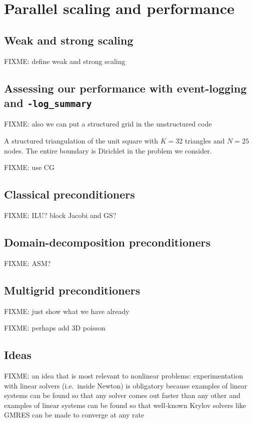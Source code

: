 
\chapter{Parallel scaling and performance}
\label{chap:scaling}

\section{Weak and strong scaling}

FIXME: define weak and strong scaling

\section{Assessing our performance with event-logging and \texttt{-log\_summary}}

\vspace{4cm}

FIXME: also we can put a structured grid in the unstructured code

\begin{marginfigure}

\caption{A structured triangulation of the unit square with $K=32$ triangles and $N=25$ nodes.  The entire boundary is Dirichlet in the problem we consider.}
\label{fig:structuredfem}
\end{marginfigure}

FIXME: use CG

\section{Classical preconditioners}

FIXME:  ILU?  block Jacobi and GS?

\section{Domain-decomposition preconditioners}

FIXME: ASM?

\section{Multigrid preconditioners}

FIXME: just show what we have already

FIXME: perhaps add 3D poisson

\section{Ideas}

FIXME: an idea that is most relevant to nonlinear problems: experimentation with linear solvers (i.e.~inside Newton) is obligatory because examples of linear systems can be found so that any solver comes out faster than any other \citep{Nachtigaletal1992} and examples of linear systems can be found so that well-known Krylov solvers like GMRES can be made to converge at any rate \citep{Greenbaumetal1996}

